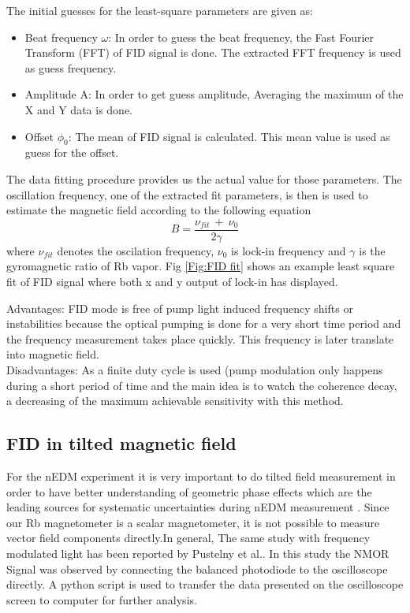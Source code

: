 The initial guesses for the least-square parameters are given
as:
\begin{itemize}
\item
Beat frequency $\omega$: In order to guess the beat frequency, the Fast Fourier Transform (FFT) of FID signal is done. The extracted FFT frequency is used as guess frequency.
\item
Amplitude A: In order to get guess amplitude, Averaging the maximum of the X and Y data is done.
\item
Offset $\phi_0$: The mean of FID signal is calculated. This mean value is used as guess for the offset. 

\end{itemize}
The data fitting procedure provides us the actual value for those parameters. The oscillation frequency, one of the extracted fit parameters, is then is used to estimate the magnetic field according to the following equation
\begin{equation}
 B= \frac{\nu_{fit}~ +~\nu_0}{2\gamma}\label{eq:field}
\end{equation}
 where $\nu_{fit}$ denotes the oscilation  frequency, $\nu_{0}$ is lock-in frequency and $\gamma$ is the gyromagnetic ratio of Rb vapor. Fig \ref{Fig:FID fit} shows an example least square fit of FID signal where both x and y output of lock-in has displayed.
 
Advantages: FID mode is free of  pump light induced frequency shifts or instabilities because the optical pumping is done for a very short time period and the frequency measurement takes place quickly. This frequency is later translate into magnetic field.\\ 

Disadvantages: As a finite duty cycle is used (pump modulation only happens during a short period of time and the main idea is to watch the coherence decay, a decreasing of the maximum achievable sensitivity with this method.



\subsection{FID in tilted magnetic field}
For the nEDM experiment it is very important to do tilted field measurement in order to have better understanding of  geometric phase effects which are the leading sources for systematic uncertainties during nEDM measurement . 
Since our Rb magnetometer is a scalar magnetometer, it is not possible to measure vector field components directly.In general,  The same study with frequency modulated light has been reported by Pustelny et al.\cite{PhysRevA.74.063420}. In this study the NMOR Signal was observed by connecting the balanced photodiode to the oscilloscope directly. A python script is used to transfer the data presented on the oscilloscope screen to computer for further analysis. 

